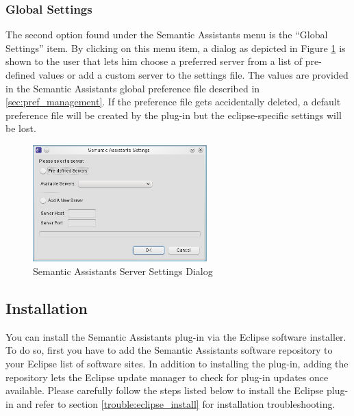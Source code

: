 \subsubsection{Global Settings}
The second option found under the Semantic Assistants menu is the ``Global
Settings'' item. By clicking on this menu item, a dialog as depicted in Figure \ref{fig:eclipse_settings} is shown to the user that lets him choose a preferred server from a list of pre-defined values or add a custom server to the settings file. The values are provided in the Semantic Assistants global preference file described in \ref{sec:pref_management}. If the preference file gets accidentally deleted, a default preference file will be created by the plug-in but the eclipse-specific settings will be lost.
\begin{figure}[htb]
\begin{center}
  \includegraphics[width=0.6\textwidth]{pictures/eclipse_settings.jpg}
  \caption{Semantic Assistants Server Settings Dialog}
  \label{fig:eclipse_settings}
\end{center}
\end{figure}

\subsection{Installation}
\label{subsec:eclipse_install}
You can install the Semantic Assistants plug-in via the Eclipse software installer. To do so, first you have to add the Semantic Assistants software repository to your Eclipse list of software sites. In addition to installing the plug-in, adding the repository lets the Eclipse update manager to check for plug-in updates once available. Please carefully follow the steps listed below to install the Eclipse plug-in and refer to section \ref{trouble:eclipse_install} for installation troubleshooting.

